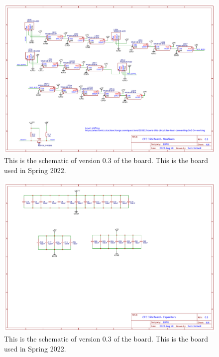 \begin{landscape}
\begin{figure}[!htb]
	\centering
	\includegraphics[width=\paperwidth]{arduinoStart/Schematic_CEC326v0.5_NeoPixels} %
	\caption{This is the schematic of version 0.3 of the board. This is the board used in Spring 2022.}
	\label{fig:boardSchematic}
\end{figure} 

\begin{figure}[!htb]
	\centering
	\includegraphics[width=\paperwidth]{arduinoStart/Schematic_CEC326v0.5_Caps} %
	\caption{This is the schematic of version 0.3 of the board. This is the board used in Spring 2022.}
	\label{fig:boardSchematic}
\end{figure} 

\end{landscape}

